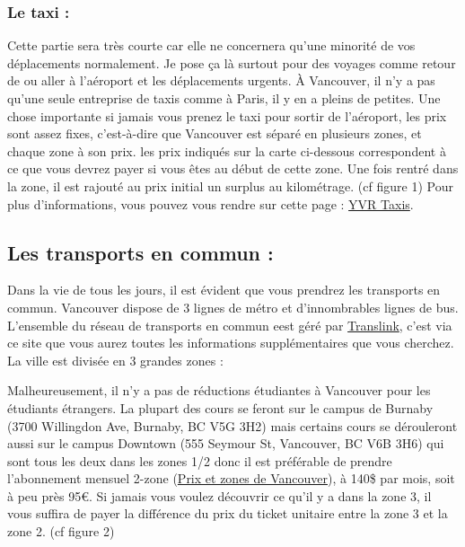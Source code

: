 \documentclass{article}
\begin{document}
\subsubsection{Le taxi :}
Cette partie sera très courte car elle ne concernera qu'une minorité de vos déplacements normalement. Je pose ça là surtout pour des voyages comme retour de ou aller à l'aéroport et les déplacements urgents. À Vancouver, il n'y a pas qu'une seule entreprise de taxis comme à Paris, il y en a pleins de petites.\newline
Une chose importante si jamais vous prenez le taxi pour sortir de l'aéroport, les prix sont assez fixes, c'est-à-dire que Vancouver est séparé en plusieurs zones, et chaque zone à son prix. les prix indiqués sur la carte ci-dessous correspondent à ce que vous devrez payer si vous êtes au début de cette zone. Une fois rentré dans la zone, il est rajouté au prix initial un surplus au kilométrage. (cf figure 1)
Pour plus d'informations, vous pouvez vous rendre sur cette page : \href{https://www.yvr.ca/en/passengers/transportation/taxis}{YVR Taxis}.
\subsection{Les transports en commun :}
Dans la vie de tous les jours, il est évident que vous prendrez les transports en commun. Vancouver dispose de 3 lignes de métro et d'innombrables lignes de bus. L'ensemble du réseau de transports en commun eest géré par \href{https://www.translink.ca/}{Translink}, c'est via ce site que vous aurez toutes les informations supplémentaires que vous cherchez.\newline
La ville est divisée en 3 grandes zones :

Malheureusement, il n'y a pas de réductions étudiantes à Vancouver pour les étudiants étrangers.\newline
La plupart des cours se feront sur le campus de Burnaby (3700 Willingdon Ave, Burnaby, BC V5G 3H2) mais certains cours se dérouleront aussi sur le campus Downtown (555 Seymour St, Vancouver, BC V6B 3H6) qui sont tous les deux dans les zones 1/2 donc il est préférable de prendre l'abonnement mensuel 2-zone (\href{https://www.translink.ca/transit-fares/pricing-and-fare-zones}{Prix et zones de Vancouver}), à 140\$ par mois, soit à peu près 95€. Si jamais vous voulez découvrir ce qu'il y a dans la zone 3, il vous suffira de payer la différence du prix du ticket unitaire entre la zone 3 et la zone 2.\newline
(cf figure 2)\newline\newline
\end{document}
